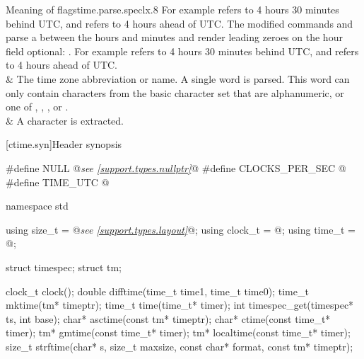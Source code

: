\begin{LongTable}{Meaning of  flags}{time.parse.spec}{lx{.8\hsize}}
For example  refers to 4 hours 30 minutes behind UTC,
and  refers to 4 hours ahead of UTC\@.
The modified commands  and 
parse a \tcode{:} between the hours and minutes
and render leading zeroes on the hour field optional:
.
For example  refers to 4 hours 30 minutes behind UTC,
and  refers to 4 hours ahead of UTC.
\\ \rowsep
{} &
The time zone abbreviation or name.
A single word is parsed.
This word can only contain characters
from the basic character set
that are alphanumeric, or one of
, , , or .
\\ \rowsep
\tcode{\%\%} &
A \tcode{\%} character is extracted.
\\
\end{LongTable}


[ctime.syn]{Header  synopsis}

%
%
%
%
%
%
%
%
%
%
%
%
%
%
%
%
%
%
%
\begin{codeblock}
#define NULL @\textit{see \ref{support.types.nullptr}}@
#define CLOCKS_PER_SEC @\seebelow@
#define TIME_UTC @\seebelow@

namespace std {
  using size_t = @\textit{see \ref{support.types.layout}}@;
  using clock_t = @\seebelow@;
  using time_t = @\seebelow@;

  struct timespec;
  struct tm;

  clock_t clock();
  double difftime(time_t time1, time_t time0);
  time_t mktime(tm* timeptr);
  time_t time(time_t* timer);
  int timespec_get(timespec* ts, int base);
  char* asctime(const tm* timeptr);
  char* ctime(const time_t* timer);
  tm* gmtime(const time_t* timer);
  tm* localtime(const time_t* timer);
  size_t strftime(char* s, size_t maxsize, const char* format, const tm* timeptr);
}
\end{codeblock}

